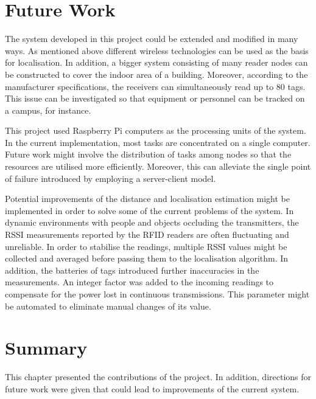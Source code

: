 \section{Future Work}
\label{sec:future}

The system developed in this project could be extended and modified in many ways. As mentioned above different wireless technologies can be used as the basis for localisation. In addition, a bigger system consisting of many reader nodes can be constructed to cover the indoor area of a building. Moreover, according to the manufacturer specifications, the receivers can simultaneously read up to 80 tags. This issue can be investigated so that equipment or personnel can be tracked on a campus, for instance. 

This project used Raspberry Pi computers as the processing units of the system. In the current implementation, most tasks are concentrated on a single computer. Future work might involve the distribution of tasks among nodes so that the resources are utilised more efficiently. Moreover, this can alleviate the single point of failure introduced by employing a server-client model.

Potential improvements of the distance and localisation estimation might be implemented in order to solve some of the current problems of the system. In dynamic environments with people and objects occluding the transmitters, the RSSI measurements reported by the RFID readers are often fluctuating and unreliable. In order to stabilise the readings, multiple RSSI values might be collected and averaged before passing them to the localisation algorithm. In addition, the batteries of tags introduced further inaccuracies in the measurements. An integer factor was added to the incoming readings to compensate for the power lost in continuous transmissions. This parameter might be automated to eliminate manual changes of its value.

\section{Summary}
This chapter presented the contributions of the project. In addition, directions for future work were given that could lead to improvements of the current system.
